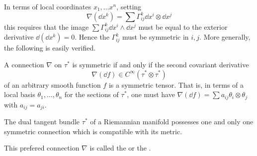 \documentclass[../main]{subfiles}
\begin{document}
In terms of local coordinates $x_1, \ldots x^n$, setting \[\nabla (\dd x^k) = \sum \Gamma_{ij}^k \dd x^i \otimes \dd x^j\] this requires that the image $\displaystyle \sum \Gamma_{ij}^k \dd x^i \wedge \dd x^j$ must be equal to the exterior derivative $\dd(\dd x^k) = 0$. Hence the  $\Gamma_{ij}^k$ must be symmetric in $i, j$. More generally, the following is easily verified. 

\begin{assertion*}
A connection $\nabla$ on $\tau^\ast$ is symmetric if and only if the second covariant derivative \[\nabla (\dd f) \in C^\infty(\tau^\ast \otimes \tau^\ast)\] of an arbitrary smooth function $f$ is a symmetric tensor. That is, in terms of a local basis $\theta_1, \ldots, \theta_n$ for the sections of $\tau^\ast$, one must have $\displaystyle \nabla(\dd f) = \sum a_{ij} \theta_i \otimes \theta_j$ with $a_{ij} = a_{ji}$. 
\end{assertion*}

\begin{lemma}
\label{lem:C.8}
The dual tangent bundle $\tau^\ast$ of a Riemannian manifold possesses one and only one symmetric connection which is compatible with its metric. 
\end{lemma}

This prefered connection $\nabla$ is called the  or the . 
\end{document}
